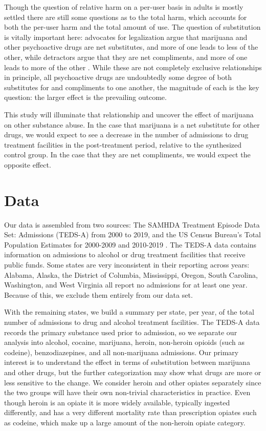 \documentclass{article}
\begin{document}
Though the question of relative harm on a per-user basis in adults is mostly settled \citep[p. 27-48]{MedicRev} there are still some questions as to the total harm, which accounts for both the per-user harm and the total amount of use. The question of substitution is vitally important here: advocates for legalization argue that marijuana and other psychoactive drugs are net substitutes, and more of one leads to less of the other, while detractors argue that they are net compliments, and more of one leads to more of the other \citep[p. 157-162]{MedicRev}. While these are not completely exclusive relationships in principle, all psychoactive drugs are undoubtedly some degree of both substitutes for and compliments to one another, the magnitude of each is the key question: the larger effect is the prevailing outcome.

This study will illuminate that relationship and uncover the effect of marijuana on other substance abuse. In the case that marijuana is a net substitute for other drugs, we would expect to see a decrease in the number of admissions to drug treatment facilities in the post-treatment period, relative to the synthesized control group. In the case that they are net compliments, we would expect the opposite effect.

\section{Data}

Our data is assembled from two sources: The SAMHDA Treatment Episode Data Set: Admissions (TEDS-A) \citep{TEDS} from 2000 to 2019, and the US Census Bureau's Total Population Estimates for 2000-2009 \citep{USCen09} and 2010-2019 \citep{USCen19}. The TEDS-A data contains information on admissions to alcohol or drug treatment facilities that receive public funds. Some states are very inconsistent in their reporting across years:  Alabama, Alaska, the District of Columbia,  Mississippi, Oregon, South Carolina, Washington, and West Virginia all report no admissions for at least one year. Because of this, we exclude them entirely from our data set. 

With the remaining states, we build a summary per state, per year, of the total number of admissions to drug and alcohol treatment facilities. The TEDS-A data records the primary substance used prior to admission, so we separate our analysis into alcohol, cocaine, marijuana, heroin, non-heroin opioids (such as codeine), benzodiazepines, and all non-marijuana admissions. Our primary interest is to understand the effect in terms of substitution between marijuana and other drugs, but the further categorization may show what drugs are more or less sensitive to the change. We consider heroin and other opiates separately since the two groups will have their own non-trivial characteristics in practice. Even though heroin is an opiate it is more widely available, typically ingested differently, and has a very different mortality rate than prescription opiates such as codeine, which make up a large amount of the non-heroin opiate category.
\end{document}
